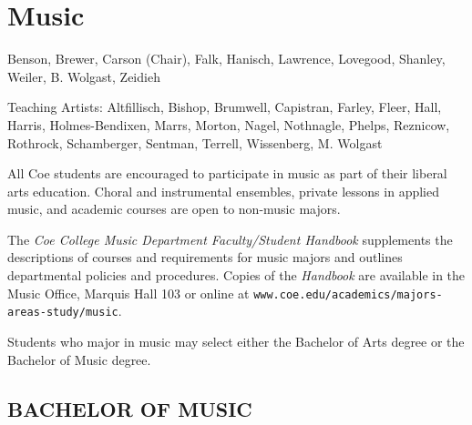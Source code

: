 \documentclass[
  letterpaper,
]{scrbook}
\begin{document}
\section{Music}\label{sec-music}

Benson, Brewer, Carson (Chair), Falk, Hanisch, Lawrence, Lovegood,
Shanley, Weiler, B. Wolgast, Zeidieh

Teaching Artists: Altfillisch, Bishop, Brumwell, Capistran, Farley,
Fleer, Hall, Harris, Holmes-Bendixen, Marrs, Morton, Nagel, Nothnagle,
Phelps, Reznicow, Rothrock, Schamberger, Sentman, Terrell, Wissenberg,
M. Wolgast

All Coe students are encouraged to participate in music as part of their
liberal arts education. Choral and instrumental ensembles, private
lessons in applied music, and academic courses are open to non-music
majors.

The \emph{Coe College Music Department Faculty/Student Handbook}
supplements the descriptions of courses and requirements for music
majors and outlines departmental policies and procedures. Copies of the
\emph{Handbook} are available in the Music Office, Marquis Hall 103 or
online at \texttt{www.coe.edu/academics/majors-areas-study/music}.

Students who major in music may select either the Bachelor of Arts
degree or the Bachelor of Music degree.

\subsection{BACHELOR OF MUSIC}\label{bachelor-of-music}
\end{document}
